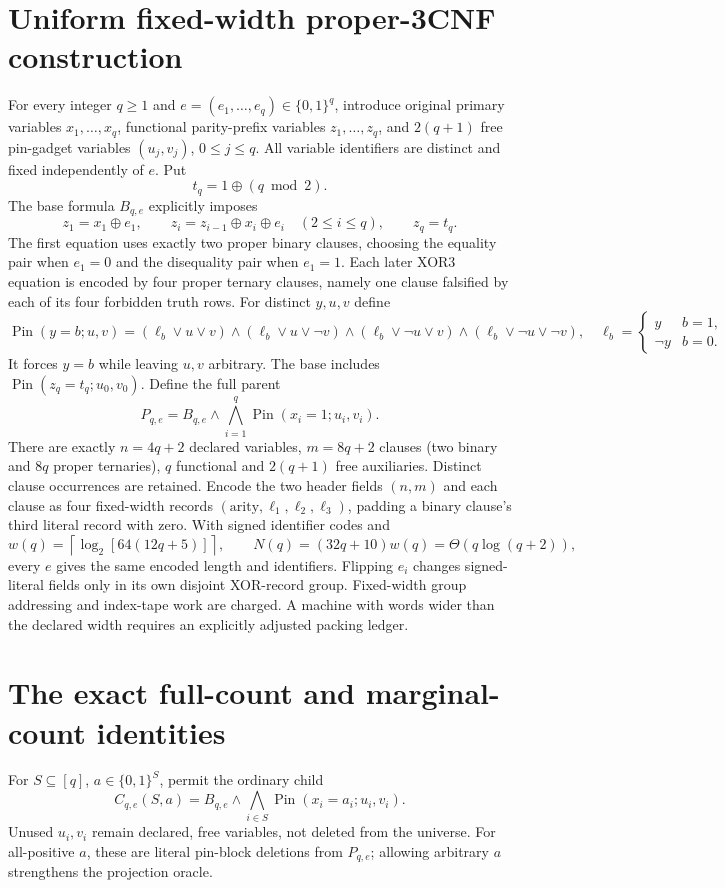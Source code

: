 \documentclass[11pt]{article}
\begin{document}
\section{Uniform fixed-width proper-3CNF construction}
For every integer $q\ge1$ and $e=(e_1,\ldots,e_q)\in\{0,1\}^q$, introduce original primary variables $x_1,\ldots,x_q$, functional parity-prefix variables $z_1,\ldots,z_q$, and $2(q+1)$ free pin-gadget variables $(u_j,v_j)$, $0\le j\le q$. All variable identifiers are distinct and fixed independently of $e$. Put
\[
 t_q=1\oplus(q\bmod 2).
\]
The base formula $B_{q,e}$ explicitly imposes
\[
 z_1=x_1\oplus e_1,\qquad
 z_i=z_{i-1}\oplus x_i\oplus e_i\quad(2\le i\le q),
 \qquad z_q=t_q.
\]
The first equation uses exactly two proper binary clauses, choosing the equality pair when $e_1=0$ and the disequality pair when $e_1=1$. Each later XOR3 equation is encoded by four proper ternary clauses, namely one clause falsified by each of its four forbidden truth rows. For distinct $y,u,v$ define
\[
\operatorname{Pin}(y=b;u,v)=
(\ell_b\vee u\vee v)\wedge(\ell_b\vee u\vee\neg v)
\wedge(\ell_b\vee\neg u\vee v)\wedge(\ell_b\vee\neg u\vee\neg v),
\quad
\ell_b=\begin{cases}y&b=1,\\\neg y&b=0.\end{cases}
\]
It forces $y=b$ while leaving $u,v$ arbitrary. The base includes $\operatorname{Pin}(z_q=t_q;u_0,v_0)$. Define the full parent
\[
 P_{q,e}=B_{q,e}\wedge
 \bigwedge_{i=1}^q\operatorname{Pin}(x_i=1;u_i,v_i).
\]
There are exactly $n=4q+2$ declared variables, $m=8q+2$ clauses (two binary and $8q$ proper ternaries), $q$ functional and $2(q+1)$ free auxiliaries. Distinct clause occurrences are retained. Encode the two header fields $(n,m)$ and each clause as four fixed-width records $(\mathrm{arity},\ell_1,\ell_2,\ell_3)$, padding a binary clause's third literal record with zero. With signed identifier codes and
\[
 w(q)=\left\lceil\log_2[64(12q+5)]\right\rceil,
 \qquad N(q)=(32q+10)w(q)=\Theta(q\log(q+2)),
\]
every $e$ gives the same encoded length and identifiers. Flipping $e_i$ changes signed-literal fields only in its own disjoint XOR-record group. Fixed-width group addressing and index-tape work are charged. A machine with words wider than the declared width requires an explicitly adjusted packing ledger.

\section{The exact full-count and marginal-count identities}
For $S\subseteq[q]$, $a\in\{0,1\}^{S}$, permit the ordinary child
\[
 C_{q,e}(S,a)=B_{q,e}\wedge\bigwedge_{i\in S}
 \operatorname{Pin}(x_i=a_i;u_i,v_i).
\]
Unused $u_i,v_i$ remain declared, free variables, not deleted from the universe. For all-positive $a$, these are literal pin-block deletions from $P_{q,e}$; allowing arbitrary $a$ strengthens the projection oracle.
\end{document}
